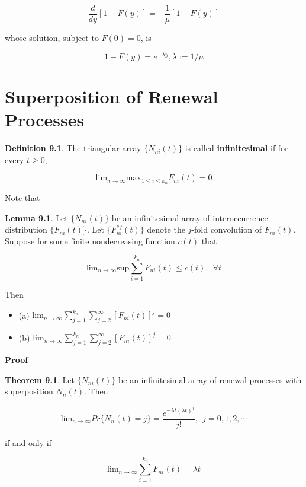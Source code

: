 \documentclass[12pt]{article}
\theoremstyle{nonumberbreak}
\begin{document}
$$
\frac{d}{dy} [1 - F(y)] = - \frac{1}{\mu} [1-F(y)]
$$

whose solution, subject to $F(0) = 0$, is

$$
1 - F(y) = e^{-\lambda y}, \lambda := 1/\mu
$$




\section{Superposition of Renewal Processes}

\begin{theorem}
\textbf{Definition 9.1}. The triangular array $\{ N_{ni}(t) \}$ is called \textbf{infinitesimal} if for every $t \ge 0$,

$$
\mathrm{lim}_{n \to \infty} \mathrm{max}_{1 \le i \le k_n} F_{ni} (t) = 0
$$
\end{theorem}

Note that

\begin{theorem}
\textbf{Lemma 9.1}. Let $\{ N_{ni}(t) \}$ be an infinitesimal array of interoccurrence distribution $\{ F_{ni} (t) \}$. Let $\{ F_{ni}^{\ast f} (t) \}$ denote the $j$-fold convolution of $F_{ni}(t)$. Suppose for some finite nondecreasing function $c(t)$ that 

$$
\mathrm{lim}_{n\to\infty} \mathrm{sup} \sum_{i=1}^{k_n} F_{ni}(t) \le c(t), \ \ \forall t
$$

Then 

\begin{itemize}
	\item (a) $\mathrm{lim}_{n\to\infty} \sum_{j=1}^{k_n} \sum_{j=2}^\infty [F_{ni}(t)]^j = 0$
	\item (b) $\mathrm{lim}_{n\to\infty} \sum_{j=1}^{k_n} \sum_{j=2}^\infty [F_{ni}(t)]^j = 0$
\end{itemize}

\end{theorem}

\textbf{Proof}



\begin{theorem}
\textbf{Theorem 9.1}. Let $\{ N_{ni}(t) \}$ be an infinitesimal array of renewal processes with superposition $N_n(t)$. Then

$$
\mathrm{lim}_{n\to\infty} Pr \{ N_n(t) = j \} = \frac{e^{-\lambda t (\lambda t)^j}}{j!}, \ \ j=0,1,2,\cdots
$$

if and only if

$$
\mathrm{lim}_{n\to\infty} \sum_{i=1}^{k_n} F_{ni}(t) = \lambda t
$$

\end{theorem}
\end{document}
